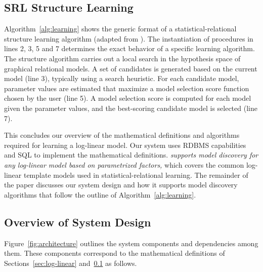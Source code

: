 \subsection{SRL Structure Learning} \label{sec:structure-learn}

Algorithm~\ref{alg:learning} shows the generic format of a statistical-relational structure learning algorithm (adapted from 
\cite{Kimmig2015}%
). The instantiation of procedures in lines 2, 3, 5 and 7 determines the exact behavior of a specific learning algorithm. The structure algorithm carries out a local search in the hypothesis space of graphical relational models. A set of candidates is generated based on the current model (line 3), typically using a search heuristic. For each candidate model, parameter values are estimated that maximize a model selection score function chosen by the  user (line 5). A model selection score is computed for each model given the parameter values, and the best-scoring candidate model is selected (line 7). 

This concludes our overview of the mathematical definitions and algorithms required for learning a log-linear model. Our \FB system uses RDBMS capabilities and SQL to implement the mathematical definitions. {\em \FB supports model discovery for any log-linear model based on parametrized factors,} which covers the common log-linear template models used in statistical-relational learning. The remainder of the paper discusses our system design and how it supports model discovery algorithms that follow the outline of Algorithm~\ref{alg:learning}.

\subsection{Overview of System Design}
 Figure~\ref{fig:architecture} outlines the system components and dependencies among them. These components correspond to the mathematical definitions of Sections~\ref{sec:log-linear} and~\ref{sec:structure-learn} as follows. 


